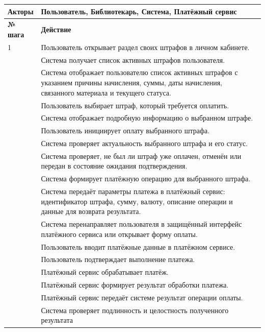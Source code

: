 \documentclass[12pt,a4paper]{article}
\begin{document}
\begin{xltabular}{\textwidth}{
				|>{\raggedright\arraybackslash}p{2.7cm}
				|>{\raggedright\arraybackslash}X|
			}
			\textbf{Акторы} &
			Пользователь, Библиотекарь, Система, Платёжный сервис \\
			\hline
			
			
			\textbf{№ шага} & \textbf{Действие} \\
			\hline
			
			1 & Пользователь открывает раздел своих штрафов в личном кабинете. \\
			 & Система получает список активных штрафов пользователя. \\
			 & Система отображает пользователю список активных штрафов с
			указанием причины начисления, суммы, даты начисления, связанного
			материала и текущего статуса. \\
			 & Пользователь выбирает штраф, который требуется оплатить. \\
			 & Система отображает подробную информацию о выбранном штрафе. \\
			 & Пользователь инициирует оплату выбранного штрафа. \\
			 & Система проверяет актуальность выбранного штрафа и его статус. \\
			 & Система проверяет, не был ли штраф уже оплачен, отменён или
			передан в состояние ожидания подтверждения. \\
			 & Система формирует платёжную операцию для выбранного штрафа. \\
			 & Система передаёт параметры платежа в платёжный сервис:
			идентификатор штрафа, сумму, валюту, описание операции и данные
			для возврата результата. \\
			 & Система перенаправляет пользователя в защищённый интерфейс
			платёжного сервиса или открывает форму оплаты. \\
			 & Пользователь вводит платёжные данные в платёжном сервисе. \\
			 & Пользователь подтверждает выполнение платежа. \\
			 & Платёжный сервис обрабатывает платёж. \\
			 & Платёжный сервис формирует результат обработки платежа. \\
			 & Платёжный сервис передаёт системе результат операции оплаты. \\
			 & Система проверяет подлинность и целостность полученного результата

\end{xltabular}
\end{document}
